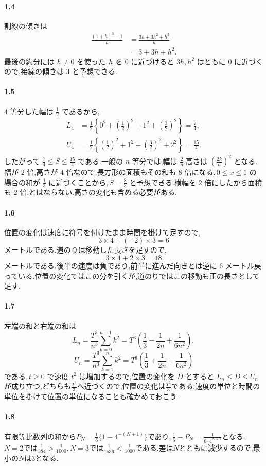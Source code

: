 \paragraph{1.4}
割線の傾きは
\begin{align*}
 \frac{(1+h)^3-1}{h}
 &=\frac{3h+3h^2+h^3}{h}\\
 &=3+3h+h^2.
\end{align*}
最後の約分には $h\ne0$ を使った.\,$h$ を $0$ に近づけると $3h,h^2$ はともに $0$ に近づくので,接線の傾きは $3$ と予想できる.

\paragraph{1.5}
$4$ 等分した幅は $\frac12$ であるから,
\begin{align*}
 L_4&=\frac12\left\{0^2+\left(\frac12\right)^2+1^2+\left(\frac32\right)^2\right\}=\frac74,\\
 U_4&=\frac12\left\{\left(\frac12\right)^2+1^2+\left(\frac32\right)^2+2^2\right\}=\frac{15}{4}.
\end{align*}
したがって $\frac74\le S\le\frac{15}{4}$ である.一般の $n$ 等分では,幅は $\frac2n$,高さは $\left(\frac{2k}{n}\right)^2$ となる.幅が $2$ 倍,高さが $4$ 倍なので,長方形の面積もその和も $8$ 倍になる.\,$0\le x\le1$ の場合の和が $\frac13$ に近づくことから,\,$S=\frac83$ と予想できる.横幅を $2$ 倍にしたから面積も $2$ 倍,とはならない.高さの変化も含める必要がある.

\paragraph{1.6}
位置の変化は速度に符号を付けたまま時間を掛けて足すので,
\[
 3\times4+(-2)\times3=6
\]
メートルである.道のりは移動した長さを足すので,
\[
 3\times4+2\times3=18
\]
メートルである.後半の速度は負であり,前半に進んだ向きとは逆に $6$ メートル戻っている.位置の変化ではこの分を引くが,道のりではこの移動も正の長さとして足す.

\paragraph{1.7}
左端の和と右端の和は
\[
 L_n=\frac{T^3}{n^3}\sum_{k=0}^{n-1}k^2
 =T^3\left(\frac13-\frac1{2n}+\frac1{6n^2}\right),
\]
\[
 U_n=\frac{T^3}{n^3}\sum_{k=1}^{n}k^2
 =T^3\left(\frac13+\frac1{2n}+\frac1{6n^2}\right)
\]
である.\,$t\ge0$ で速度 $t^2$ は増加するので,位置の変化を $D$ とすると $L_n\le D\le U_n$ が成り立つ.どちらも$\frac{T^3}{3}$へ近づくので,位置の変化は$\frac{T^3}{3}$である.速度の単位と時間の単位を掛けて位置の単位になることも確かめておこう.
\paragraph{1.8}
有限等比数列の和から$P_N=\frac16\{1-4^{-(N+1)}\}$であり,\,$\frac16-P_N=\frac1{6\cdot4^{N+1}}$となる.\,$N=2$では$\frac1{384}>\frac1{1000}$,\,$N=3$では$\frac1{1536}<\frac1{1000}$である.差は$N$とともに減少するので,最小の$N$は$3$となる.
